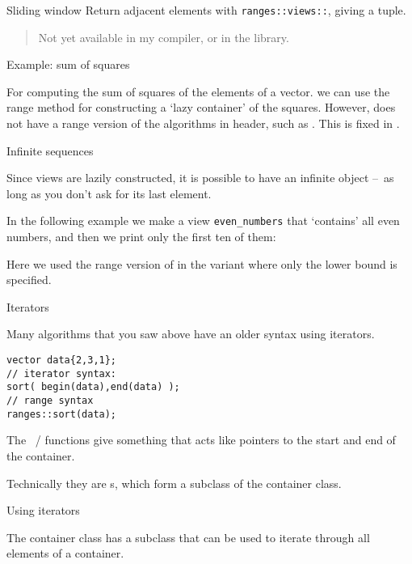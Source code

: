 \begin{block}{Sliding window}
  \label{sl:range-adjacent}
  Return adjacent elements with \lstinline{ranges::views::},
  giving a tuple.
  \begin{quote}
    Not yet available in my compiler, or in the  library.
  \end{quote}
\end{block}

 {Example: sum of squares}

For computing the sum of squares of the elements of a vector.
we can use the range  method
for constructing a `lazy container' of the squares.
However,  does not have a range version
of the algorithms in  header,
such as .
This is fixed in .


 {Infinite sequences}

Since views are lazily constructed,
it is possible to have an infinite object
--~as long as you don't ask for its last element.

In the following example we make a view \lstinline{even_numbers}
that `contains' all even numbers,
and then we print only the first ten of them:
%

Here we used the range version of 
in the variant where only the lower bound is specified.

 {Iterators}
\label{sec:iterator}
\label{sec:iterator-use}

Many algorithms that you saw above
have an older syntax using iterators.

\begin{lstlisting}
vector data{2,3,1};
// iterator syntax:
sort( begin(data),end(data) );
// range syntax
ranges::sort(data);
\end{lstlisting}
The ~/  functions
give something that acts like pointers to the start and end of the container.

Technically they are s,
which form a subclass of the container class.

 {Using iterators}
\label{sec:iterator-class}

The container class has a subclass  that can be
used to iterate through all elements of a container. 

